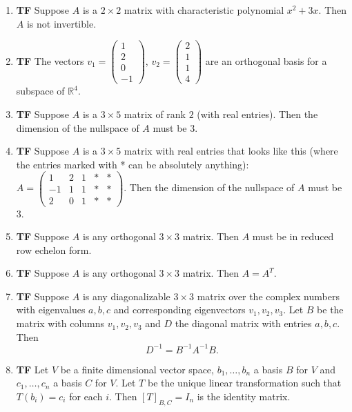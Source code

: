 \documentclass[12pt]{article}
\newcommand{\tf}[1]{\item {\bf {\color{blue}\hspace{1em}T\hspace{1em}F}}\hspace{1em} #1\vspace{1.1ex}}
\newcommand{\R}{\mathbb{R}}
\begin{document}
\begin{enumerate}
\tf{Suppose $A$ is a $2\times 2$ matrix with  characteristic polynomial $x^{2} + 3x$.  Then $A$ is not invertible.}

\tf{The vectors $v_1=\left(\begin{array}{rrr}
1 \\
2  \\
0\\
-1
\end{array}\right)$,
$v_2=\left(\begin{array}{rrr}
2\\
1\\
1\\
4
\end{array}\right)$  are an orthogonal basis for a subspace of $\R^4$.}

\tf{Suppose $A$ is a $3\times 5$ matrix of rank $2$ (with real entries).  Then the dimension of the nullspace of $A$ must be $3$.}

\tf{Suppose $A$ is a $3\times 5$ matrix with real entries that looks like this (where the entries marked with * can be absolutely anything): $A={\left(\begin{array}{rrrrr}
1 & 2 & 1 & * & * \\
-1 & 1 & 1 & * & * \\
2 & 0 & 1 & * & *
\end{array}\right)}$.  Then the dimension of the nullspace of $A$ must be $3$.}

\tf{Suppose $A$ is any orthogonal $3\times 3$ matrix.  Then $A$ must be in reduced row echelon form.}

\tf{Suppose $A$ is any orthogonal $3\times 3$ matrix.  Then $A=A^T$.}

\tf{Suppose $A$ is any diagonalizable $3\times 3$ matrix over the complex numbers with eigenvalues $a,b,c$ and corresponding eigenvectors $v_1, v_2, v_3$.  Let $B$ be the matrix with columns $v_1, v_2, v_3$ and $D$ the diagonal matrix with entries $a,b,c$.  Then $$D^{-1} = B^{-1} A^{-1} B.$$}

\tf{Let $V$ be a finite dimensional vector space, $b_1,\ldots, b_n$ a basis $B$ for $V$
and $c_1,\ldots, c_n$ a basis $C$ for $V$.   Let $T$ be the unique linear transformation
such that $T(b_i)=c_i$ for each $i$.  Then $[T]_{B,C} = I_n$ is the identity matrix.}

\end{enumerate}
\end{document}
